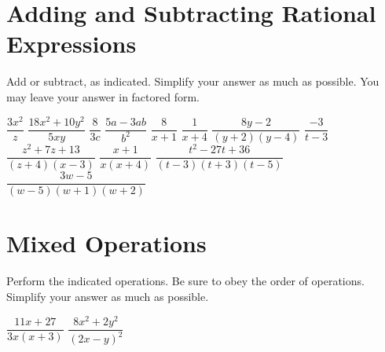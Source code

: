 \section*{Adding and Subtracting Rational Expressions}
Add or subtract, as indicated.  Simplify your answer as much as possible.  You may leave your answer in factored form.
\begin{smenum}
\mitemxxx
{$\dfrac{3x^2}{z}$}
{$\dfrac{18x^2+10y^2}{5xy}$}
{$\dfrac{8}{3c}$}
\mitemxxx
{$\dfrac{5a-3ab}{b^2}$}
{$\dfrac{8}{x+1}$}
{$\dfrac{1}{x+4}$}
\mitemxxx
{$\dfrac{8y-2}{(y+2)(y-4)}$}
{$\dfrac{-3}{t-3}$}
{$\dfrac{z^2+7z+13}{(z+4)(x-3)}$}
\mitemxxx
{$\dfrac{x+1}{x(x+4)}$}
{$\dfrac{t^2-27t+36}{(t-3)(t+3)(t-5)}$}
{$\dfrac{3w-5}{(w-5)(w+1)(w+2)}$}
\end{smenum}

\section*{Mixed Operations}
Perform the indicated operations.  Be sure to obey the order of operations.  Simplify your answer as much as possible.
\begin{smenum}
\mitemxx
{$\dfrac{11x+27}{3x(x+3)}$}
{$\dfrac{8x^2+2y^2}{(2x-y)^2}$}
\end{smenum}


